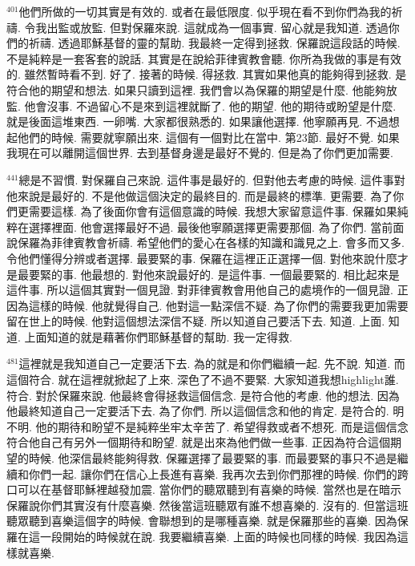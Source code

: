 \documentclass{book}
\begin{document}
$^{401}$他們所做的一切其實是有效的.
或者在最低限度.
似乎現在看不到你們為我的祈禱.
令我出監或放監.
但對保羅來說.
這就成為一個事實.
留心就是我知道.
透過你們的祈禱.
透過耶穌基督的靈的幫助.
我最終一定得到拯救.
保羅說這段話的時候.
不是純粹是一套客套的說話.
其實是在說給菲律賓教會聽.
你所為我做的事是有效的.
雖然暫時看不到.
好了.
接著的時候.
得拯救.
其實如果他真的能夠得到拯救.
是符合他的期望和想法.
如果只讀到這裡.
我們會以為保羅的期望是什麼.
他能夠放監.
他會沒事.
不過留心不是來到這裡就斷了.
他的期望.
他的期待或盼望是什麼.
就是後面這堆東西.
一卵嘴.
大家都很熟悉的.
如果讓他選擇.
他寧願再見.
不過想起他們的時候.
需要就寧願出來.
這個有一個對比在當中.
第23節.
最好不覺.
如果我現在可以離開這個世界.
去到基督身邊是最好不覺的.
但是為了你們更加需要.

$^{441}$總是不習慣.
對保羅自己來說.
這件事是最好的.
但對他去考慮的時候.
這件事對他來說是最好的.
不是他做這個決定的最終目的.
而是最終的標準.
更需要.
為了你們更需要這樣.
為了後面你會有這個意識的時候.
我想大家留意這件事.
保羅如果純粹在選擇裡面.
他會選擇最好不過.
最後他寧願選擇更需要那個.
為了你們.
當前面說保羅為菲律賓教會祈禱.
希望他們的愛心在各樣的知識和識見之上.
會多而又多.
令他們懂得分辨或者選擇.
最要緊的事.
保羅在這裡正正選擇一個.
對他來說什麼才是最要緊的事.
他最想的.
對他來說最好的.
是這件事.
一個最要緊的.
相比起來是這件事.
所以這個其實對一個見證.
對菲律賓教會用他自己的處境作的一個見證.
正因為這樣的時候.
他就覺得自己.
他對這一點深信不疑.
為了你們的需要我更加需要留在世上的時候.
他對這個想法深信不疑.
所以知道自己要活下去.
知道.
上面.
知道.
上面知道的就是藉著你們耶穌基督的幫助.
我一定得救.

$^{481}$這裡就是我知道自己一定要活下去.
為的就是和你們繼續一起.
先不說.
知道.
而這個符合.
就在這裡就掀起了上來.
深色了不過不要緊.
大家知道我想highlight誰.
符合.
對於保羅來說.
他最終會得拯救這個信念.
是符合他的考慮.
他的想法.
因為他最終知道自己一定要活下去.
為了你們.
所以這個信念和他的肯定.
是符合的.
明不明.
他的期待和盼望不是純粹坐牢太辛苦了.
希望得救或者不想死.
而是這個信念符合他自己有另外一個期待和盼望.
就是出來為他們做一些事.
正因為符合這個期望的時候.
他深信最終能夠得救.
保羅選擇了最要緊的事.
而最要緊的事只不過是繼續和你們一起.
讓你們在信心上長進有喜樂.
我再次去到你們那裡的時候.
你們的跨口可以在基督耶穌裡越發加震.
當你們的聽眾聽到有喜樂的時候.
當然也是在暗示保羅說你們其實沒有什麼喜樂.
然後當這班聽眾有誰不想喜樂的.
沒有的.
但當這班聽眾聽到喜樂這個字的時候.
會聯想到的是哪種喜樂.
就是保羅那些的喜樂.
因為保羅在這一段開始的時候就在說.
我要繼續喜樂.
上面的時候也同樣的時候.
我因為這樣就喜樂.
\end{document}
